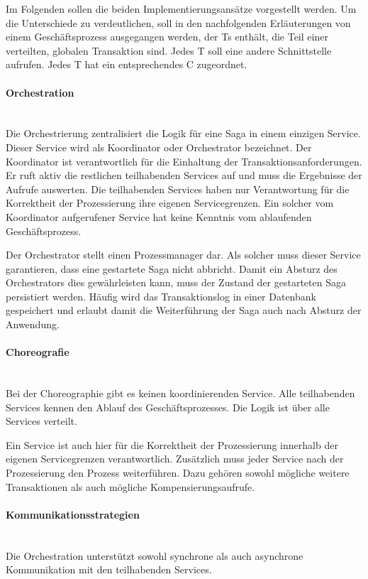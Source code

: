 Im Folgenden sollen die beiden Implementierungsansätze vorgestellt werden. Um die Unterschiede zu verdeutlichen, soll in den nachfolgenden Erläuterungen von einem Geschäftsprozess ausgegangen werden, der Ts enthält, die Teil einer verteilten, globalen Transaktion sind. Jedes T soll eine andere Schnittstelle aufrufen. Jedes T hat ein entsprechendes C zugeordnet. 

\paragraph*{Orchestration} \mbox{}\\
Die Orchestrierung zentralisiert die Logik für eine Saga in einem einzigen Service. Dieser Service wird als Koordinator oder Orchestrator bezeichnet. Der Koordinator ist verantwortlich für die Einhaltung der Transaktionsanforderungen. Er ruft aktiv die restlichen teilhabenden Services auf und muss die Ergebnisse der Aufrufe auswerten. Die teilhabenden Services haben nur Verantwortung für die Korrektheit der Prozessierung ihre eigenen Servicegrenzen. Ein solcher vom Koordinator aufgerufener Service hat keine Kenntnis vom ablaufenden Geschäftsprozess. 

Der Orchestrator stellt einen Prozessmanager dar. Als solcher muss dieser Service garantieren, dass eine gestartete Saga nicht abbricht. Damit ein Absturz des Orchestrators dies gewährleisten kann, muss der Zustand der gestarteten Saga persistiert werden. Häufig wird das Transaktionslog in einer Datenbank gespeichert und erlaubt damit die Weiterführung der Saga auch nach Absturz der Anwendung. 

\paragraph*{Choreografie} \mbox{}\\
Bei der Choreographie gibt es keinen koordinierenden Service. Alle teilhabenden Services kennen den Ablauf des Geschäftsprozesses. Die Logik ist über alle Services verteilt. 

Ein Service ist auch hier für die Korrektheit der Prozessierung innerhalb der eigenen Servicegrenzen verantwortlich. Zusätzlich muss jeder Service nach der Prozessierung den Prozess weiterführen. Dazu gehören sowohl mögliche weitere Transaktionen als auch mögliche Kompensierungsaufrufe. 


\paragraph*{Kommunikationsstrategien} \mbox{}\\
Die Orchestration unterstützt sowohl synchrone als auch asynchrone Kommunikation mit den teilhabenden Services. 

